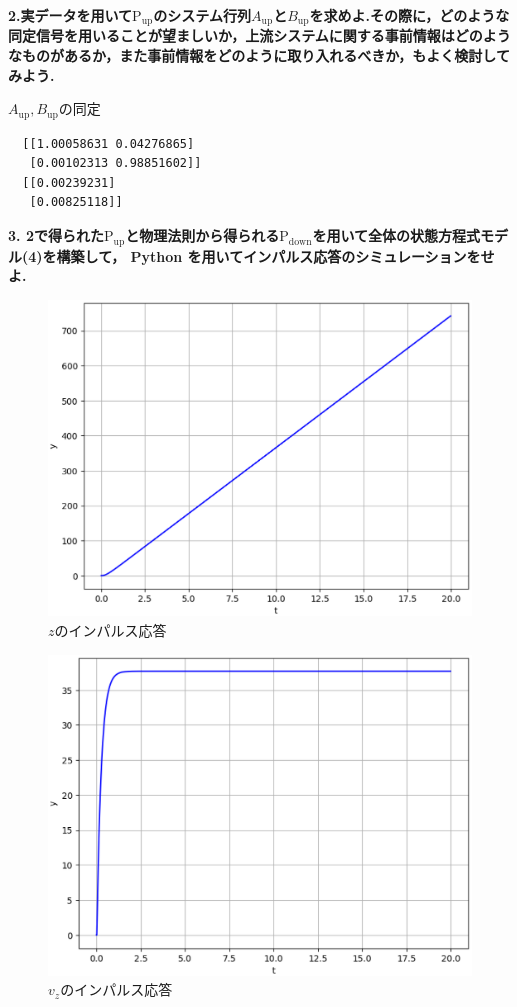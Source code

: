 \documentclass[a4paper,10.5pt]{ltjsarticle}
\begin{document}
{\large \bfseries 2.実データを用いて$\mathrm{P_{up}}$のシステム行列$A_\mathrm{up}$と$B_\mathrm{up}$を求めよ.その際に，どのような同定信号を用いることが望ましいか，上流システムに関する事前情報はどのようなものがあるか，また事前情報をどのように取り入れるべきか，もよく検討してみよう.}\\

\centerline{$A_\mathrm{up},B_\mathrm{up}$の同定}
\begin{lstlisting}
  [[1.00058631 0.04276865]
   [0.00102313 0.98851602]]
  [[0.00239231]
   [0.00825118]]
\end{lstlisting}

{\large \bfseries 3. 2で得られた$\mathrm{P_{up}}$と物理法則から得られる$\mathrm{P_{down}}$を用いて全体の状態方程式モデル(4)を構築して，
Python を用いてインパルス応答のシミュレーションをせよ.}\\

\begin{figure}[h]
  \centering
  \includegraphics[scale=0.5]{figure6.eps}
  \caption{$z$のインパルス応答}
\end{figure}

\begin{figure}[h]
  \centering
  \includegraphics[scale=0.5]{figure7.eps}
  \caption{$v_z$のインパルス応答}
\end{figure}
\end{document}
